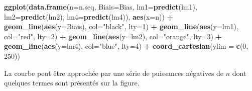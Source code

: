 \documentclass[
  11pt,
  french,
  a4paper,
  extrafontsizes,onecolumn,openright
  ]{memoir}
\newenvironment{Shaded}{\begin{snugshade}}{\end{snugshade}}
\newcommand{\DataTypeTok}[1]{\textcolor[rgb]{0.13,0.29,0.53}{#1}}
\newcommand{\DecValTok}[1]{\textcolor[rgb]{0.00,0.00,0.81}{#1}}
\newcommand{\KeywordTok}[1]{\textcolor[rgb]{0.13,0.29,0.53}{\textbf{#1}}}
\newcommand{\NormalTok}[1]{#1}
\newcommand{\OperatorTok}[1]{\textcolor[rgb]{0.81,0.36,0.00}{\textbf{#1}}}
\newcommand{\StringTok}[1]{\textcolor[rgb]{0.31,0.60,0.02}{#1}}
\begin{document}
\begin{Shaded}
\begin{Highlighting}[]
\KeywordTok{ggplot}\NormalTok{(}\KeywordTok{data.frame}\NormalTok{(}\DataTypeTok{n=}\NormalTok{n.seq, }\DataTypeTok{Biais=}\NormalTok{Bias, }\DataTypeTok{lm1=}\KeywordTok{predict}\NormalTok{(lm1), }
        \DataTypeTok{lm2=}\KeywordTok{predict}\NormalTok{(lm2), }\DataTypeTok{lm4=}\KeywordTok{predict}\NormalTok{(lm4)), }\KeywordTok{aes}\NormalTok{(}\DataTypeTok{x=}\NormalTok{n)) }\OperatorTok{+}
\StringTok{  }\KeywordTok{geom_line}\NormalTok{(}\KeywordTok{aes}\NormalTok{(}\DataTypeTok{y=}\NormalTok{Biais), }\DataTypeTok{col=}\StringTok{"black"}\NormalTok{, }\DataTypeTok{lty=}\DecValTok{1}\NormalTok{) }\OperatorTok{+}
\StringTok{  }\KeywordTok{geom_line}\NormalTok{(}\KeywordTok{aes}\NormalTok{(}\DataTypeTok{y=}\NormalTok{lm1), }\DataTypeTok{col=}\StringTok{"red"}\NormalTok{, }\DataTypeTok{lty=}\DecValTok{2}\NormalTok{) }\OperatorTok{+}
\StringTok{  }\KeywordTok{geom_line}\NormalTok{(}\KeywordTok{aes}\NormalTok{(}\DataTypeTok{y=}\NormalTok{lm2), }\DataTypeTok{col=}\StringTok{"orange"}\NormalTok{, }\DataTypeTok{lty=}\DecValTok{3}\NormalTok{) }\OperatorTok{+}
\StringTok{  }\KeywordTok{geom_line}\NormalTok{(}\KeywordTok{aes}\NormalTok{(}\DataTypeTok{y=}\NormalTok{lm4), }\DataTypeTok{col=}\StringTok{"blue"}\NormalTok{, }\DataTypeTok{lty=}\DecValTok{4}\NormalTok{) }\OperatorTok{+}
\StringTok{  }\KeywordTok{coord_cartesian}\NormalTok{(}\DataTypeTok{ylim =} \KeywordTok{c}\NormalTok{(}\DecValTok{0}\NormalTok{, }\DecValTok{250}\NormalTok{))}
\end{Highlighting}
\end{Shaded}

\normalsize

La courbe peut être approchée par une série de puissances négatives de \(n\) dont quelques termes sont présentés sur la figure.

\scriptsize
\end{document}
